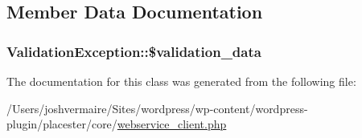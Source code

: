 \subsection{Member Data Documentation}
\hypertarget{class_validation_exception_a13534a6fddfb52548ec60f31ba76df64}{
\subsubsection[{\$validation\_\-data}]{\setlength{\rightskip}{0pt plus 5cm}ValidationException::\$validation\_\-data}}
\label{db/dd2/class_validation_exception_a13534a6fddfb52548ec60f31ba76df64}


The documentation for this class was generated from the following file:\begin{DoxyCompactItemize}
\item 
/Users/joshvermaire/Sites/wordpress/wp-\/content/wordpress-\/plugin/placester/core/\hyperlink{webservice__client_8php}{webservice\_\-client.php}\end{DoxyCompactItemize}
